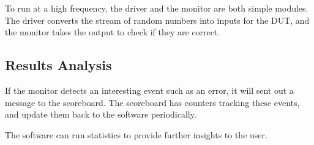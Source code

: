 To run at a high frequency, the driver and the monitor are both simple modules.
The driver converts the stream of random numbers into inputs for the DUT, and
the monitor takes the output to check if they are correct.

\subsection{Results Analysis}
If the monitor detects an interesting event such as an error, it will sent out
a message to the scoreboard.
The scoreboard has counters tracking these events, and update them back to the
software periodically.

The software can run statistics to provide further insights to the user.